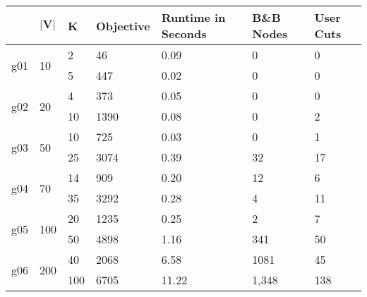 \documentclass{article}
\begin{document}
\begin{table}[h!]
	\centering
	\label{tab:scf}
	\begin{tabular}{l|l|l|l|l|l|l}
		\textbf{}           & $\mathbf{|V|}$      	& \textbf{K} 	& \textbf{Objective} & \textbf{Runtime in Seconds} & \textbf{B\&B Nodes} & \textbf{User Cuts} \\ \hline
		\multirow{2}{*}{g01}& \multirow{2}{*}{10} 	& 2          	& 46                 & 0.09                        & 0             & 0                          \\
							&                   	& 5       		& 447                & 0.02                        & 0             & 0                         \\ \hline
		\multirow{2}{*}{g02}& \multirow{2}{*}{20} 	& 4          	& 373                & 0.05                        & 0             & 0                          \\
							&                   	& 10        	& 1390               & 0.08                        & 0             & 2                          \\ \hline
		\multirow{2}{*}{g03}& \multirow{2}{*}{50} 	& 10         	& 725                & 0.03                        & 0             & 1                          \\
							&                   	& 25         	& 3074               & 0.39                        & 32             & 17                         \\ \hline
		\multirow{2}{*}{g04}& \multirow{2}{*}{70} 	& 14         	& 909                & 0.20                        & 12            & 6                          \\
							&                   	& 35         	& 3292               & 0.28                        & 4             & 11                          \\ \hline
		\multirow{2}{*}{g05}& \multirow{2}{*}{100} 	& 20         	& 1235               & 0.25                        & 2             & 7                          \\
							&                   	& 50         	& 4898               & 1.16                        & 341             & 50                         \\ \hline
		\multirow{2}{*}{g06}& \multirow{2}{*}{200} 	& 40         	& 2068               & 6.58                        & 1081          & 45                           \\
							&                   	& 100        	& 6705               & 11.22                       & 1,348        & 138                           \\ \hline

\end{tabular}
\end{table}
\end{document}
